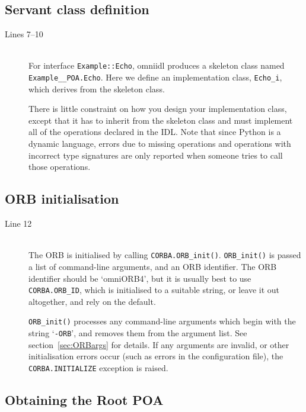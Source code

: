 \documentclass[11pt,oneside,a4paper]{book}
\newcommand{\type}[1]{\texttt{#1}}
\newcommand{\intf}[1]{\texttt{#1}}
\newcommand{\code}[1]{\texttt{#1}}
\newcommand{\op}[1]{\texttt{#1()}}
\newcommand{\cmdline}[1]{\texttt{#1}}
\begin{document}
\subsection{Servant class definition}

\begin{description}

\item[Lines 7--10]\mbox{}\\
%
For interface \intf{Example::Echo}, omniidl produces a skeleton class
named \type{Example\_\_POA.Echo}. Here we define an implementation
class, \type{Echo\_i}, which derives from the skeleton class.

There is little constraint on how you design your implementation
class, except that it has to inherit from the skeleton class and must
implement all of the operations declared in the IDL. Note that since
Python is a dynamic language, errors due to missing operations and
operations with incorrect type signatures are only reported when
someone tries to call those operations.

\end{description}


\subsection{ORB initialisation}

\begin{description}

\item[Line 12]\mbox{}\\
%
The ORB is initialised by calling \op{CORBA.ORB\_init}.
\op{ORB\_init} is passed a list of command-line arguments, and
an ORB identifier. The ORB identifier should be `omniORB4', but it is
usually best to use \code{CORBA.ORB\_ID}, which is initialised to a
suitable string, or leave it out altogether, and rely on the default.

\op{ORB\_init} processes any command-line arguments which begin with
the string `\cmdline{-ORB}', and removes them from the argument
list. See section~\ref{sec:ORBargs} for details. If any arguments are
invalid, or other initialisation errors occur (such as errors in the
configuration file), the \code{CORBA.INITIALIZE} exception is raised.

\end{description}

\subsection{Obtaining the Root POA}
\end{document}
